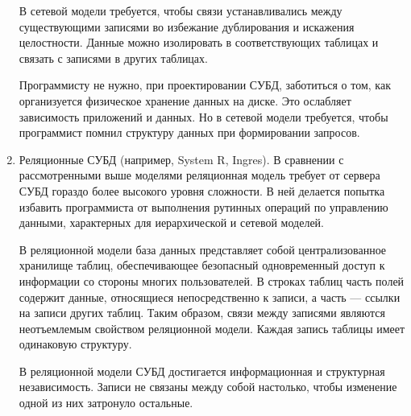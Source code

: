 \documentclass[12pt,a4paper,oneside]{article} %
\begin{document}
\begin{enumerate}
В сетевой модели требуется, чтобы связи устанавливались между \linebreak
существующими записями во избежание дублирования и искажения \linebreak
целостности. Данные можно изолировать в соответствующих таблицах \linebreak
и связать с записями в других таблицах.

Программисту не нужно, при проектировании СУБД, заботиться о том, \linebreak
как организуется физическое хранение данных на диске. Это \linebreak
ослабляет зависимость приложений и данных. Но в сетевой модели \linebreak
требуется, чтобы программист помнил структуру данных при \linebreak
формировании запросов.

\item Реляционные СУБД (например, System R, Ingres). В сравнении \linebreak
с рассмотренными выше моделями реляционная модель требует от \linebreak
сервера СУБД гораздо более высокого уровня сложности. В ней делается \linebreak
попытка избавить программиста от выполнения рутинных операций по \linebreak
управлению данными, характерных для иерархической и сетевой моделей.

В реляционной модели база данных представляет собой \linebreak
централизованное хранилище таблиц, обеспечивающее безопасный \linebreak
одновременный доступ к информации со стороны многих \linebreak
пользователей. В строках таблиц часть полей содержит данные, \linebreak
относящиеся непосредственно к записи, а часть — ссылки на \linebreak
записи других таблиц. Таким образом, связи между записями \linebreak
являются неотъемлемым свойством реляционной модели. Каждая \linebreak
запись таблицы имеет одинаковую структуру.

В реляционной модели СУБД достигается информационная и \linebreak
структурная независимость. Записи не связаны между собой \linebreak
настолько, чтобы изменение одной из них затронуло остальные.


\end{enumerate}
\end{document}
